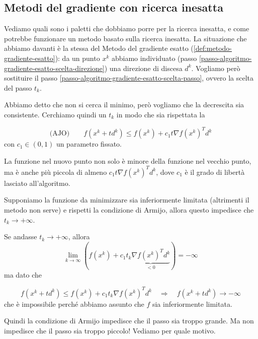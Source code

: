 \subsection{Metodi del gradiente con ricerca inesatta} Vediamo quali
sono i paletti che dobbiamo porre per la ricerca inesatta, e come
potrebbe funzionare un metodo basato sulla ricerca inesatta. La
situazione che abbiamo davanti \`e la stessa del Metodo del gradiente
esatto (\ref{def:metodo-gradiente-esatto}): da un punto $x^k$ abbiamo
individuato (passo
\ref{passo-algoritmo-gradiente-esatto-scelta-direzione}) una direzione
di discesa $d^k$. Vogliamo però sostituire il passo
\ref{passo-algoritmo-gradiente-esatto-scelta-passo}, ovvero la scelta
del passo $t_k$.

Abbiamo detto che non si cerca il minimo, però vogliamo che la
decrescita sia consistente. Cerchiamo quindi un $t_k$ in modo che sia
rispettata la
\begin{defn}
\label{def:condizione-armijo}
$$  \text{(AJO)} \qquad  f(x^{k}+ td^{k}) \leq  f(x^{k}) + c_1 t \nabla f(x^{k})^{T} d^{k}$$
con $ c_1\in (0,1)$ un parametro fissato.

La funzione nel nuovo punto non solo \`e minore della funzione nel
vecchio punto, ma \`e anche pi\`u piccola di almeno $c_1 t \nabla
f(x^{k})^{T} d^{k}$, dove $c_1$ \`e il grado di libert\`a lasciato
all'algoritmo.
\end{defn}

\begin{property}
\label{prop:armijo-tk-non-infinito} Supponiamo la funzione da
minimizzare sia inferiormente limitata (altrimenti il metodo non
serve) e rispetti la condizione di Armijo, allora questo impedisce che
$ t_k \rightarrow + \infty$.

\begin{thproof} Se andasse $ t_k \rightarrow + \infty$,
allora $$\lim_{k \to \infty} (f(x^{k}) + c_1 t_k \underbrace{\nabla
f(x^{k})^{T}d^{k}}_{<0} ) = -\infty$$ ma dato che

$$f(x^{k} + td^{k}) \leq f(x^{k}) + c_1 t_k \nabla f(x^{k})^{T}d^{k} \quad \Longrightarrow \quad f(x^{k} + td^{k}) \rightarrow -\infty$$
che \`e impossibile perché abbiamo assunto che $f$ sia inferiormente
limitata.
\end{thproof}
\end{property}

Quindi la condizione di Armijo impedisce che il passo sia troppo
grande. Ma non impedisce che il passo sia troppo piccolo! Vediamo per
quale motivo.

